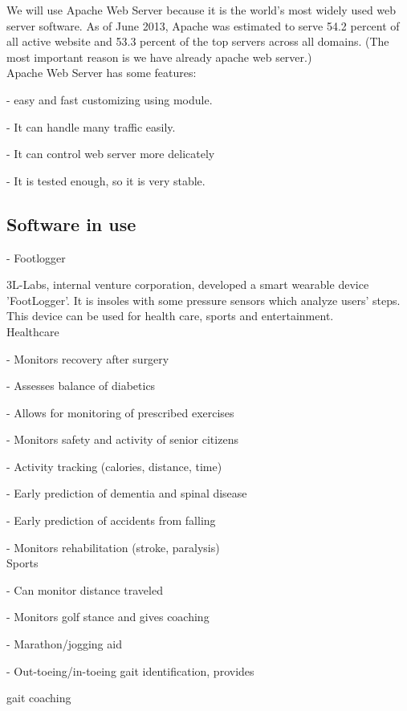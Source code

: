 \documentclass[conference]{IEEEtran}
\begin{document}
 We will use Apache Web Server because it is the world's most widely used web server software. As of June 2013, Apache was estimated to serve 54.2 percent of all active website and 53.3 percent of the top servers across all domains. (The most important reason is we have already apache web server.)\\

Apache Web Server has some features:

- easy and fast customizing using module.

- It can handle many traffic easily.

- It can control web server more delicately

- It is tested enough, so it is very stable.\\

\subsection{Software in use}

-	Footlogger

3L-Labs, internal venture corporation, developed a smart wearable device 'FootLogger'. It is insoles with some pressure sensors which analyze users' steps. This device can be used for health care, sports and entertainment.\\

Healthcare

- Monitors recovery after surgery

- Assesses balance of diabetics

- Allows for monitoring of prescribed exercises 

- Monitors safety and activity of senior citizens

- Activity tracking (calories, distance, time)

- Early prediction of dementia and spinal disease

- Early prediction of accidents from falling

- Monitors rehabilitation (stroke, paralysis)\\

Sports

- Can monitor distance traveled

- Monitors golf stance and gives coaching

- Marathon/jogging aid

- Out-toeing/in-toeing gait identification, provides 

gait coaching
 
\end{document}
